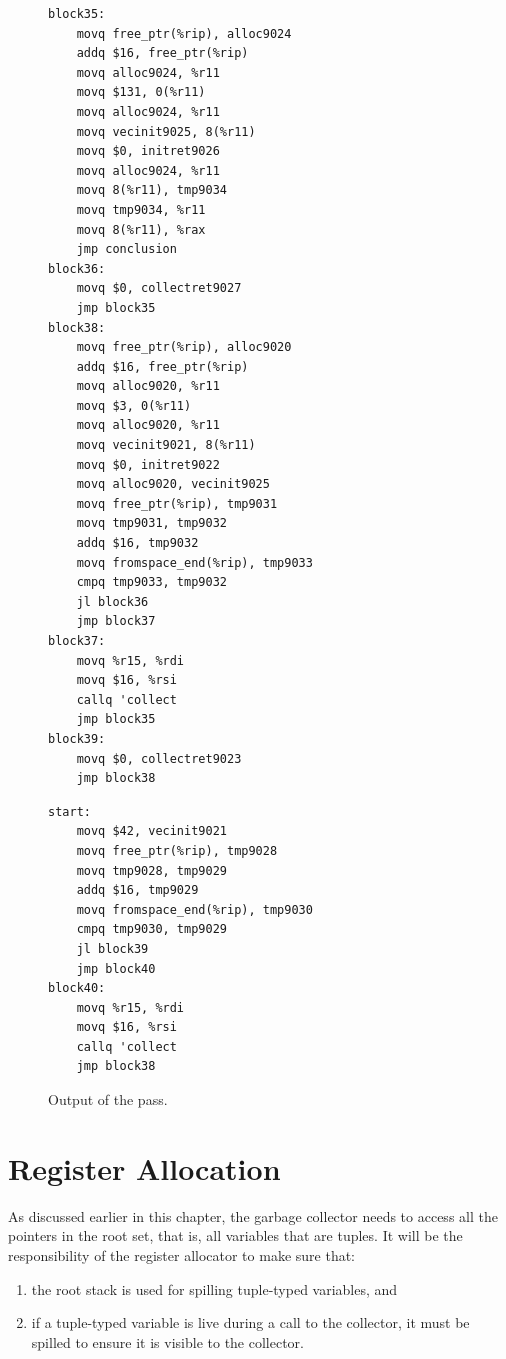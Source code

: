 \documentclass[7x10]{TimesAPriori_MIT}%
\begin{document}
\begin{figure}[tbp]
\centering
\begin{minipage}[t]{0.5\textwidth}
\begin{lstlisting}[basicstyle=\ttfamily\scriptsize]
block35:
    movq free_ptr(%rip), alloc9024
    addq $16, free_ptr(%rip)
    movq alloc9024, %r11
    movq $131, 0(%r11)
    movq alloc9024, %r11
    movq vecinit9025, 8(%r11)
    movq $0, initret9026
    movq alloc9024, %r11
    movq 8(%r11), tmp9034
    movq tmp9034, %r11
    movq 8(%r11), %rax
    jmp conclusion
block36:
    movq $0, collectret9027
    jmp block35
block38:
    movq free_ptr(%rip), alloc9020
    addq $16, free_ptr(%rip)
    movq alloc9020, %r11
    movq $3, 0(%r11)
    movq alloc9020, %r11
    movq vecinit9021, 8(%r11)
    movq $0, initret9022
    movq alloc9020, vecinit9025
    movq free_ptr(%rip), tmp9031
    movq tmp9031, tmp9032
    addq $16, tmp9032
    movq fromspace_end(%rip), tmp9033
    cmpq tmp9033, tmp9032
    jl block36
    jmp block37
block37:
    movq %r15, %rdi
    movq $16, %rsi
    callq 'collect
    jmp block35
block39:
    movq $0, collectret9023
    jmp block38
\end{lstlisting}
\end{minipage}
\begin{minipage}[t]{0.45\textwidth}
\begin{lstlisting}[basicstyle=\ttfamily\scriptsize]
start:
    movq $42, vecinit9021
    movq free_ptr(%rip), tmp9028
    movq tmp9028, tmp9029
    addq $16, tmp9029
    movq fromspace_end(%rip), tmp9030
    cmpq tmp9030, tmp9029
    jl block39
    jmp block40
block40:
    movq %r15, %rdi
    movq $16, %rsi
    callq 'collect
    jmp block38
\end{lstlisting}
\end{minipage}
\caption{Output of the  pass.}
\label{fig:select-instr-output-gc}
\end{figure}

\clearpage

\section{Register Allocation}
\label{sec:reg-alloc-gc}

As discussed earlier in this chapter, the garbage collector needs to
access all the pointers in the root set, that is, all variables that
are tuples. It will be the responsibility of the register allocator
to make sure that:
\begin{enumerate}
\item the root stack is used for spilling tuple-typed variables, and
\item if a tuple-typed variable is live during a call to the
  collector, it must be spilled to ensure it is visible to the
  collector.
\end{enumerate}
\end{document}
